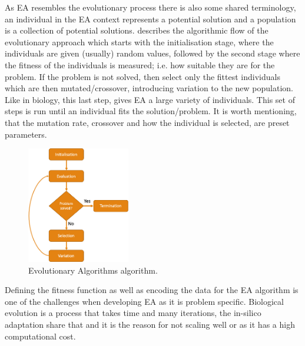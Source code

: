 
As EA resembles the evolutionary process there is also some shared terminology, an individual in the EA context represents a potential solution and a population is a collection of potential solutions.  describes the algorithmic flow of the evolutionary approach which starts with the initialisation stage, where the individuals are given (usually) random values, followed by the second stage where the fitness of the individuals is measured; i.e. how suitable they are for the problem. If the problem is not solved, then select only the fittest individuals which are then mutated/crossover, introducing variation to the new population. Like in biology, this last step, gives EA a large variety of individuals. This set of steps is run until an individual fits the solution/problem. It is worth mentioning, that the mutation rate, crossover and how the individual is selected, are preset parameters. 

\begin{figure}[!htb]
  \centering\includegraphics[width=0.4\textwidth,height=0.4\textheight,keepaspectratio]{Images/Resources/EA_basic.png}
    \caption{Evolutionary Algorithms algorithm.}
    \label{fig:ea_basic}
\end{figure}
\FloatBarrier


Defining the fitness function as well as encoding the data for the EA algorithm is one of the challenges when developing EA as it is problem specific. Biological evolution is a process that takes time and many iterations, the in-silico adaptation share that and it is the reason for not scaling well or as it has a high computational cost.


